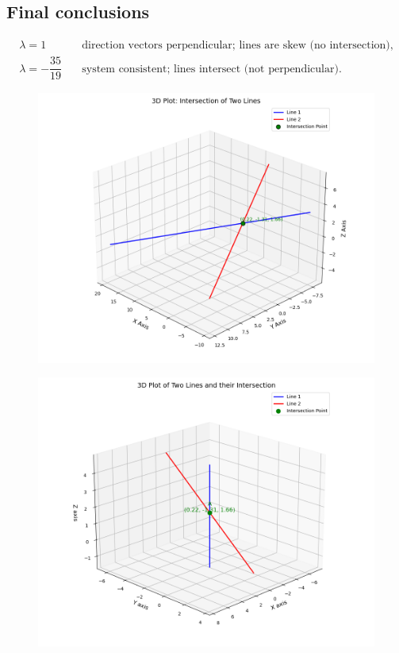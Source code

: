 \documentclass[journal]{IEEEtran}
\begin{document}
\subsection*{Final conclusions}
\begin{align}
\boxed{\lambda=1} &\quad\text{direction vectors perpendicular; lines are skew (no intersection),}\nonumber\\
\boxed{\lambda=-\dfrac{35}{19}} &\quad\text{system consistent; lines intersect (not perpendicular).}\nonumber
\end{align}


\begin{figure}[h]
    \centering
    \includegraphics[width=0.9\columnwidth]{figs/fig71.png}
    \caption{}
    \label{fig:placeholder1}
\end{figure}

\begin{figure}
    \centering
    \includegraphics[width=0.9\columnwidth]{figs/fig72.png}
    \caption{}
    \label{fig:placeholder2}
\end{figure}
\end{document}
